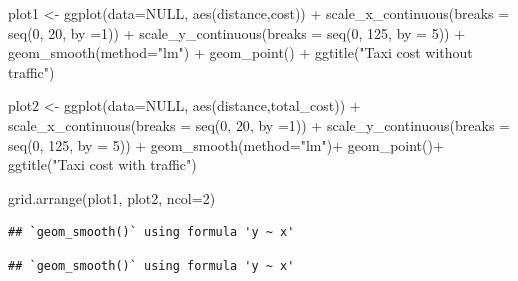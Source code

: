 \documentclass[
]{book}
\newenvironment{Shaded}{\begin{snugshade}}{\end{snugshade}}
\newcommand{\AttributeTok}[1]{\textcolor[rgb]{0.77,0.63,0.00}{#1}}
\newcommand{\ConstantTok}[1]{\textcolor[rgb]{0.00,0.00,0.00}{#1}}
\newcommand{\DecValTok}[1]{\textcolor[rgb]{0.00,0.00,0.81}{#1}}
\newcommand{\FunctionTok}[1]{\textcolor[rgb]{0.00,0.00,0.00}{#1}}
\newcommand{\NormalTok}[1]{#1}
\newcommand{\OtherTok}[1]{\textcolor[rgb]{0.56,0.35,0.01}{#1}}
\newcommand{\SpecialCharTok}[1]{\textcolor[rgb]{0.00,0.00,0.00}{#1}}
\newcommand{\StringTok}[1]{\textcolor[rgb]{0.31,0.60,0.02}{#1}}
\begin{document}
\begin{Shaded}
\begin{Highlighting}[]
\NormalTok{plot1 }\OtherTok{\textless{}{-}} \FunctionTok{ggplot}\NormalTok{(}\AttributeTok{data=}\ConstantTok{NULL}\NormalTok{, }\FunctionTok{aes}\NormalTok{(distance,cost)) }\SpecialCharTok{+}
  \FunctionTok{scale\_x\_continuous}\NormalTok{(}\AttributeTok{breaks =} \FunctionTok{seq}\NormalTok{(}\DecValTok{0}\NormalTok{, }\DecValTok{20}\NormalTok{, }\AttributeTok{by =}\DecValTok{1}\NormalTok{)) }\SpecialCharTok{+}
  \FunctionTok{scale\_y\_continuous}\NormalTok{(}\AttributeTok{breaks =} \FunctionTok{seq}\NormalTok{(}\DecValTok{0}\NormalTok{, }\DecValTok{125}\NormalTok{, }\AttributeTok{by =} \DecValTok{5}\NormalTok{)) }\SpecialCharTok{+} 
  \FunctionTok{geom\_smooth}\NormalTok{(}\AttributeTok{method=}\StringTok{"lm"}\NormalTok{) }\SpecialCharTok{+}
  \FunctionTok{geom\_point}\NormalTok{() }\SpecialCharTok{+}
  \FunctionTok{ggtitle}\NormalTok{(}\StringTok{"Taxi cost without traffic"}\NormalTok{)}

\NormalTok{plot2 }\OtherTok{\textless{}{-}} \FunctionTok{ggplot}\NormalTok{(}\AttributeTok{data=}\ConstantTok{NULL}\NormalTok{, }\FunctionTok{aes}\NormalTok{(distance,total\_cost)) }\SpecialCharTok{+}
  \FunctionTok{scale\_x\_continuous}\NormalTok{(}\AttributeTok{breaks =} \FunctionTok{seq}\NormalTok{(}\DecValTok{0}\NormalTok{, }\DecValTok{20}\NormalTok{, }\AttributeTok{by =}\DecValTok{1}\NormalTok{)) }\SpecialCharTok{+}
  \FunctionTok{scale\_y\_continuous}\NormalTok{(}\AttributeTok{breaks =} \FunctionTok{seq}\NormalTok{(}\DecValTok{0}\NormalTok{, }\DecValTok{125}\NormalTok{, }\AttributeTok{by =} \DecValTok{5}\NormalTok{)) }\SpecialCharTok{+} 
  \FunctionTok{geom\_smooth}\NormalTok{(}\AttributeTok{method=}\StringTok{"lm"}\NormalTok{)}\SpecialCharTok{+}
  \FunctionTok{geom\_point}\NormalTok{()}\SpecialCharTok{+}
  \FunctionTok{ggtitle}\NormalTok{(}\StringTok{"Taxi cost with traffic"}\NormalTok{)}

\FunctionTok{grid.arrange}\NormalTok{(plot1, plot2, }\AttributeTok{ncol=}\DecValTok{2}\NormalTok{)}
\end{Highlighting}
\end{Shaded}

\begin{verbatim}
## `geom_smooth()` using formula 'y ~ x'
\end{verbatim}

\begin{verbatim}
## `geom_smooth()` using formula 'y ~ x'
\end{verbatim}
\end{document}
